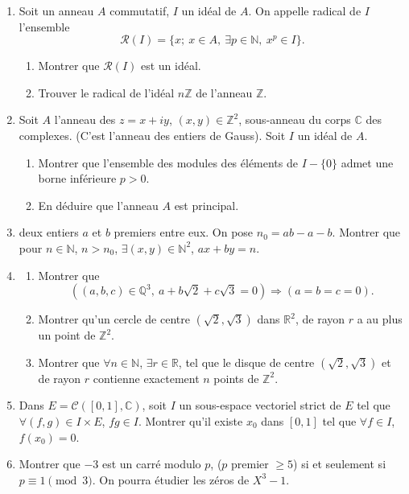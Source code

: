\begin{enumerate}[label=\arabic*.,leftmargin=2.2em,itemsep=1.1em]
\item Soit un anneau $A$ commutatif, $I$ un idéal de $A$. On appelle radical de $I$ l'ensemble
\[
\mathcal R(I)=\{x;\ x\in A,\ \exists p\in\mathbb N,\ x^p\in I\}.
\]
\begin{enumerate}[label=\alph*),leftmargin=2em]
\item Montrer que $\mathcal R(I)$ est un idéal.
\item Trouver le radical de l'idéal $n\mathbb Z$ de l'anneau $\mathbb Z$.
\end{enumerate}

\item Soit $A$ l'anneau des $z=x+iy$, $(x,y)\in\mathbb Z^2$, sous-anneau du corps $\mathbb C$ des complexes. (C'est l'anneau des entiers de Gauss). Soit $I$ un idéal de $A$.
\begin{enumerate}[label=\alph*),leftmargin=2em]
\item Montrer que l'ensemble des modules des éléments de $I-\{0\}$ admet une borne inférieure $p>0$.
\item En déduire que l'anneau $A$ est principal.
\end{enumerate}

\item {} deux entiers $a$ et $b$ premiers entre eux. On pose $n_0=ab-a-b$. Montrer que pour $n\in\mathbb N$, $n>n_0$, $\exists(x,y)\in\mathbb N^2$, $ax+by=n$.

\item
\begin{enumerate}[label=\arabic*),leftmargin=2em]
\item Montrer que
\[
((a,b,c)\in\mathbb Q^3,\ a+b\sqrt2+c\sqrt3=0)\Rightarrow(a=b=c=0).
\]
\item Montrer qu'un cercle de centre $(\sqrt2,\sqrt3)$ dans $\mathbb R^2$, de rayon $r$ a au plus un point de $\mathbb Z^2$.
\item Montrer que $\forall n\in\mathbb N$, $\exists r\in\mathbb R$, tel que le disque de centre $(\sqrt2,\sqrt3)$ et de rayon $r$ contienne exactement $n$ points de $\mathbb Z^2$.
\end{enumerate}

\item Dans $E=\mathcal C([0,1],\mathbb C)$, soit $I$ un sous-espace vectoriel strict de $E$ tel que $\forall(f,g)\in I\times E$, $fg\in I$. Montrer qu'il existe $x_0$ dans $[0,1]$ tel que $\forall f\in I$, $f(x_0)=0$.

\item Montrer que $-3$ est un carré modulo $p$, ($p$ premier $\ge5$) si et seulement si $p\equiv1\pmod3$. On pourra étudier les zéros de $X^3-1$.


\end{enumerate}
